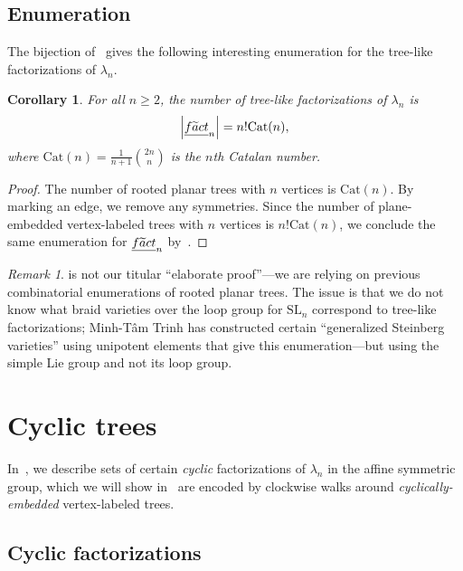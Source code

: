 \documentclass[a4paper,10pt,leqno]{amsart}
\newcommand{\darkred}{\color{darkred}}
\numberwithin{equation}{section}
\newtheorem{corollary}[theorem]{Corollary}
\theoremstyle{definition}
\theoremstyle{remark}
\newtheorem{remark}[theorem]{Remark}
\newcommand{\Ft}{\textsc{f}\widetilde{\textsc{a}}\textsc{ct}}
\newcommand{\EFt}{\underline{\Ft}}
\newcommand{\Cat}{\mathrm{Cat}}
\newcommand{\defn}[1]{\emph{\darkred #1}}
\begin{document}
\subsection{Enumeration}

The bijection of~ gives the following interesting enumeration for the tree-like factorizations of $\lambda_n$.

\begin{corollary}
\label{cor:tree_like_enumeration}
For all $n\geq 2$, the number of tree-like factorizations of $\lambda_n$ is
\[\left|\EFt_n\right| = n! \Cat(n),\] where $\Cat(n) = \frac{1}{n+1}\binom{2n}{n}$ is the $n$th \defn{Catalan number}.
\end{corollary}

\begin{proof}
The number of rooted planar trees with $n$ vertices is $\Cat(n)$.  By marking an edge, we remove any symmetries.  Since the number of plane-embedded vertex-labeled trees with $n$ vertices is $n!\Cat(n)$, we conclude the same enumeration for $\EFt_n$ by~.
\end{proof}

\begin{remark}
 is not our titular ``elaborate proof''---we are relying on previous combinatorial enumerations of rooted planar trees.  The issue is that we do not know what braid varieties over the loop group for $\mathrm{SL}_n$ correspond to tree-like factorizations; Minh-T\^am Trinh has constructed certain ``generalized Steinberg varieties'' using unipotent elements that give this enumeration---but using the simple Lie group and not its loop group.
\end{remark}


\section{Cyclic trees}
 \label{sec:cyclic_trees}

In~, we describe sets of certain \emph{cyclic} factorizations of $\lambda_n$ in the affine symmetric group, which we will show in~ are encoded by clockwise walks around \emph{cyclically-embedded} vertex-labeled trees.

\subsection{Cyclic factorizations}
 \label{sec:cyclic_factorizations}
\end{document}
